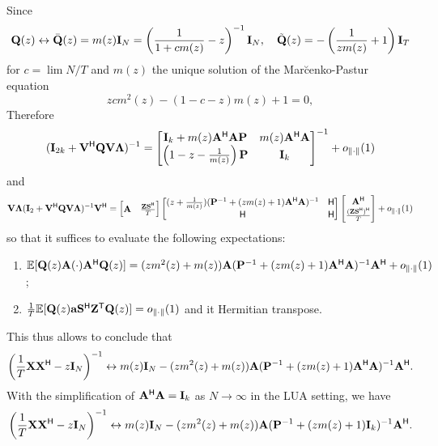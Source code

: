 \documentclass[11pt,a4paper]{article}
\begin{document}
Since
\begin{equation}
	{\mathbf{Q}}(z) \leftrightarrow \bar {{\mathbf{Q}}}(z) = m(z) \mathbf{I}_N = \left(  \frac1{1 + c m(z)} - z \right)^{-1} \mathbf{I}_N, \quad \tilde {{\mathbf{Q}}}(z) = - \left(\frac1{z m(z)}+1\right) \mathbf{I}_T
\end{equation}
for $c = \lim N/T$ and $m(z)$ the unique solution of the Mar{\u c}enko-Pastur equation
\begin{equation}
	z c m^2(z) - (1 - c -z) m(z) + 1 = 0,
\end{equation}
Therefore
\begin{equation}
	(\mathbf{I}_{2k} + \mathbf{V}^{\sf H} {\mathbf{Q}} \mathbf{V} \boldsymbol{\Lambda})^{-1} = \begin{bmatrix} \mathbf{I}_k + m(z) {\mathbf{A}}^{\sf H} {\mathbf{A}} \mathbf{P} & m(z) {\mathbf{A}}^{\sf H} {\mathbf{A}}  \\ \left( 1 - z - \frac1{m(z)} \right) \mathbf{P} & \mathbf{I}_k  \end{bmatrix}^{-1} + o_{\| \cdot \|}(1)
\end{equation}
and 
\begin{equation}
	\mathbf{V} \boldsymbol{\Lambda} (\mathbf{I}_2 + \mathbf{V}^{\sf H} {\mathbf{Q}} \mathbf{V} \boldsymbol{\Lambda})^{-1} \mathbf{V}^{\sf H} = \begin{bmatrix}{\mathbf{A}} & \frac{{\mathbf{Z}} {\mathbf{S}}^{\sf H}}{T}\end{bmatrix} \begin{bmatrix} (z + \frac1{m(z)}) ( \mathbf{P}^{-1} + (z m(z) + 1) {\mathbf{A}}^{\sf H} {\mathbf{A}}  )^{-1} & {\sf H} \\ {\sf H} & {\sf H} \end{bmatrix} \begin{bmatrix}{\mathbf{A}}^{\sf H} \\ \frac{({\mathbf{Z}} {\mathbf{S}}^{\sf H})^{\sf H}}{T}\end{bmatrix} + o_{\| \cdot \|} (1)
\end{equation}
so that it suffices to evaluate the following expectations:
\begin{enumerate}
 	\item ${\mathbb{E}}[{\mathbf{Q}}(z) {\mathbf{A}} (\cdot) {\mathbf{A}}^{\sf H} {\mathbf{Q}}(z)] = (z m^2(z) + m(z)) {\mathbf{A}} (\mathbf{P}^{-1} + (z m(z) + 1) {\mathbf{A}}^{\sf H} {\mathbf{A}}  )^{-1} {\mathbf{A}}^{\sf H}  + o_{\| \cdot \|}(1)$;
 	\item $\frac1T {\mathbb{E}}[{\mathbf{Q}}(z) \mathbf{a} {\mathbf{S}}^{\sf H} {\mathbf{Z}}^{\sf T} {\mathbf{Q}}(z)] = o_{\| \cdot \|}(1)$ and it Hermitian transpose.
 \end{enumerate}
This thus allows to conclude that
\begin{equation}
	\left(\frac1T {\mathbf{X}} {\mathbf{X}}^{\sf H} - z \mathbf{I}_N \right)^{-1} \leftrightarrow m(z) \mathbf{I}_N - (z m^2(z) + m(z)) {\mathbf{A}} (\mathbf{P}^{-1} + (z m(z) + 1) {\mathbf{A}}^{\sf H} {\mathbf{A}}  )^{-1} {\mathbf{A}}^{\sf H}.
\end{equation}
With the simplification of ${\mathbf{A}}^{\sf H} {\mathbf{A}} = \mathbf{I}_k$ as $N \to \infty$ in the LUA setting, we have
\begin{equation}
	\left(\frac1T {\mathbf{X}} {\mathbf{X}}^{\sf H} - z \mathbf{I}_N \right)^{-1} \leftrightarrow m(z) \mathbf{I}_N - (z m^2(z) + m(z)) {\mathbf{A}} (\mathbf{P}^{-1} + (z m(z) + 1) \mathbf{I}_k  )^{-1} {\mathbf{A}}^{\sf H}.
\end{equation}
\end{document}
